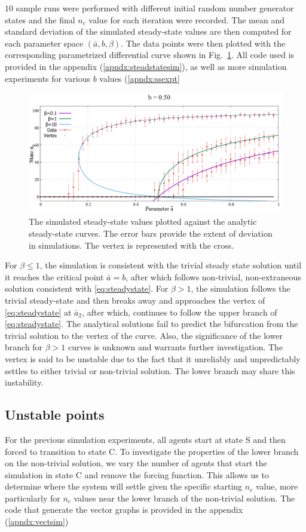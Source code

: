 $10$ sample runs were performed with different initial random number generator states and the final $n_{c}$ value for each iteration were recorded.
The mean and standard deviation of the simulated steady-state values are then computed for each parameter space $(\bar{a},b,\beta)$. 
The data points were then plotted with the corresponding parametrized differential curve shown in Fig.~\ref{fig:phase+sim}.
All code used is provided in the appendix (\ref{apndx:steadstatesim}), as well as more simulation experiments for various $b$ values (\ref{apndx:ssexpt}

\begin{figure}[h!]
 \centering
  \includegraphics[width=\linewidth]{images/chapter3/phase+sim.png}
  \caption{The simulated steady-state values plotted against the analytic steady-state curves. The error bars provide the extent of deviation in simulations. The vertex is represented with the cross.}
  \label{fig:phase+sim}
\end{figure}

For $\beta \leq 1$, the simulation is consistent with the trivial steady state solution until it reaches the critical point $\bar{a} = b$, after which follows non-trivial, non-extraneous solution consistent with \eqref{eq:steadystate}.
For $\beta > 1$, the simulation follows the trivial steady-state and then breaks away and approaches the vertex of \eqref{eq:steadystate} at $\bar{a}_{2}$, after which, continues to follow the upper branch of \eqref{eq:steadystate}.
The analytical solutions fail to predict the bifurcation from the trivial solution to the vertex of the curve.
Also, the significance of the lower branch for $\beta > 1$ curves is unknown and warrants further investigation.
The vertex is said to be unstable due to the fact that it unreliably and unpredictably settles to either trivial or non-trivial solution.
The lower branch may share this instability.    

\subsection{Unstable points}
For the previous simulation experiments, all agents start at state S and then forced to transition to state C. 
To investigate the properties of the lower branch on the non-trivial solution, we vary the number of agents that start the simulation in state C and remove the forcing function. 
This allows us to determine where the system will settle given the specific starting $n_{c}$ value, more particularly for $n_{c}$ values near the lower branch of the non-trivial solution. 
The code that generate the vector graphs is provided in the appendix (\ref{apndx:vectsim})

